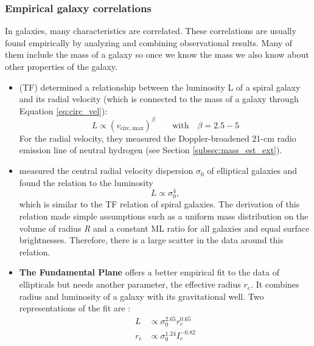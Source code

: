 \subsubsection{Empirical galaxy correlations}
In galaxies, many characteristics are correlated. These correlations are usually found empirically by analyzing and combining observational results. Many of them include the mass of a galaxy so once we know the mass we also know about other properties of the galaxy. 
\begin{itemize}
    \item \textbf{\citet{Tully...Fisher...1977}} (TF) determined a relationship between the luminosity L of a spiral galaxy and its radial velocity (which is connected to the mass of a galaxy through Equation \ref{eq:circ_vel}):
    \begin{equation}
        L \propto (v_{\mathrm{circ, max}})^\beta \qquad \mathrm{with}\quad \beta =  2.5 - 5
    \end{equation}
    For the radial velocity, they measured the Doppler-broadened 21-cm radio emission line of neutral hydrogen (see Section \ref{subsec:mass_est_ext}). 
    \item \textbf{\citet{Faber...Jackson...1976}} measured the central radial velocity dispersion $\sigma_0$ of elliptical galaxies and found the relation to the luminosity  
    \begin{equation}
        L \propto \sigma_0^4,
    \end{equation}
    which is similar to the \acs{TF} relation of spiral galaxies. The derivation of this relation made simple assumptions such as a uniform mass distribution on the volume of radius \textit{R} and a constant \ac{ML} ratio for all galaxies and equal surface brightnesses. Therefore, there is a large scatter in the data around this relation.
    \item \textbf{The Fundamental Plane} offers a better empirical fit to the data of ellipticals but needs another parameter, the effective radius $r_e$. It combines radius and luminosity of a galaxy with its gravitational well. Two representations of the fit are \citep{Carroll...Ostlie..2006}:
    \begin{align}
        L &\propto \sigma_0^{2.65}r_e^{0.65} \\
        r_e &\propto \sigma_0^{1.24}I_e^{-0.82}
    \end{align}
    \iffalse\item M\_vir - N\_GC \fi
\end{itemize}

